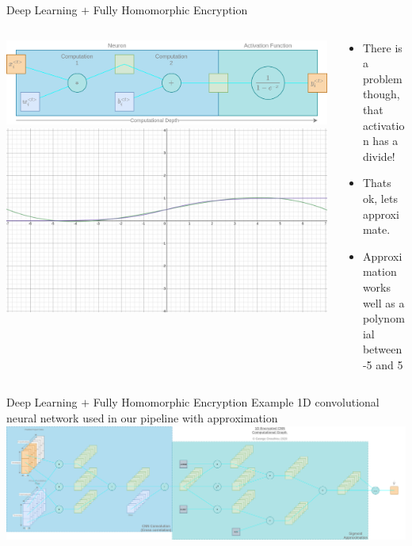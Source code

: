 \documentclass[aspectratio=169]{beamer}
\begin{document}
    \begin{frame}{Deep Learning $+$ Fully Homomorphic Encryption}
      \begin{columns}
        \begin{column}{0.5\textwidth}
          \includegraphics[width=1\linewidth]{neuron.png}
          \includegraphics[width=1\linewidth]{desmos.png}
        \end{column}
        \begin{column}{0.5\textwidth}
          \begin{itemize}
            \item There is a problem though, that activation has a divide!
            \item Thats ok, lets approximate.
            \item Approximation works well as a polynomial between -5 and 5
          \end{itemize}
        \end{column}
      \end{columns}
    \end{frame}

    \begin{frame}{Deep Learning $+$ Fully Homomorphic Encryption}
      Example 1D convolutional neural network used in our pipeline with approximation \\
      \includegraphics[width=1\linewidth]{encrypted_cnn.png}
    \end{frame}
\end{document}
